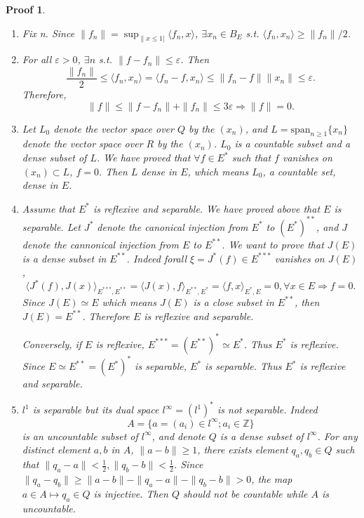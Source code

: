 \documentclass[hyperref,UTF8]{ctexart}
\newtheorem{pf}{Proof}[section]
\begin{document}
\begin{pf}
    \begin{enumerate}
        \item Fix n. Since $\|f_n\| = \sup_{\|x\leq 1|}\langle f_n, x \rangle$,  $\exists x_n\in B_E$ s.t.  $\langle f_n, x_n\rangle \geq \|f_n\|/2$.
        \item For all $\varepsilon > 0$, $\exists n$ s.t. $\|f - f_n\|\leq \varepsilon$. Then
        \[
            \frac{\|f_n\|}{2}\leq\langle f_n, x_n\rangle = \langle f_n - f, x_n\rangle \leq \|f_n - f\|\|x_n\|\leq \varepsilon.
        \]
        Therefore, 
        \[
            \|f\|\leq \|f - f_n\| + \|f_n\|\leq 3\varepsilon \Rightarrow \|f\| = 0.
        \]
        \item Let $L_0$ denote the vector space over $Q$ by the $(x_n)$, and $L=\text{span}_{n\geq1}\{x_n\}$ denote the vector space over $R$ by the $(x_n)$. $L_0$ is a countable subset and a dense subset of $L$.  We have proved that $\forall f \in E^*$ such that $f$ vanishes on $(x_n)\subset L$, $f = 0$. Then $L$ dense in $E$, which means $L_0$, a countable set, dense in $E$. 
        \item Assume that $E^*$ is reflexive and separable. We have proved above that $E$ is separable. Let $J^*$ denote the canonical injection from $E^*$ to $(E^*)^{**}$, and $J$ denote the cannonical injection from $E$ to $E^{**}$. We want to prove that $J(E)$ is a dense subset in $E^{**}$. Indeed forall $\xi = J^*(f)\in E^{***}$ vanishes on $J(E)$, 
        \[
            \langle J^*(f), J(x)\rangle_{E^{***},E^{**}} = 
            \langle J(x), f\rangle_{E^{**}, E^*} = 
            \langle f, x\rangle_{E^*, E} = 0, \forall x \in E
            \Rightarrow f = 0. 
        \]
        Since $J(E)\simeq E$ which means $J(E)$ is a close subset in $E^{**}$, then $J(E) = E^{**}$. Therefore $E$ is reflexive and separable. 
        
        Conversely, if $E$ is reflexive, $E^{***} = (E^{**})^*\simeq E^{*}$. Thus $E^*$ is reflexive. Since $E\simeq E^{**} = (E^*)^*$ is separable, $E^*$ is separable. Thus $E^*$ is reflexive and separable. 
        \item $l^1$ is separable but its dual space $l^{\infty}=(l^1)^*$ is not separable. Indeed
        \[A = \{a = (a_i)\in l^\infty;a_i\in \mathbb Z\}\]
        is an uncountable subset of $l^\infty$, and denote $Q$ is a dense subset of $l^\infty$. For any distinct element $a,b$ in $A$, $\|a - b\|\geq1$, there exists element $q_a, q_b\in Q$ such that $\|q_a - a\|<\frac12, \|q_b - b\|<\frac12$. Since $\|q_a - q_b\|\geq \|a - b\| -\|q_a - a\| - \|q_b - b\| > 0$, the map $a\in A\mapsto q_a\in Q$ is injective. Then $Q$ should not be countable while $A$ is uncountable. 
    \end{enumerate}    
\end{pf}
\end{document}
